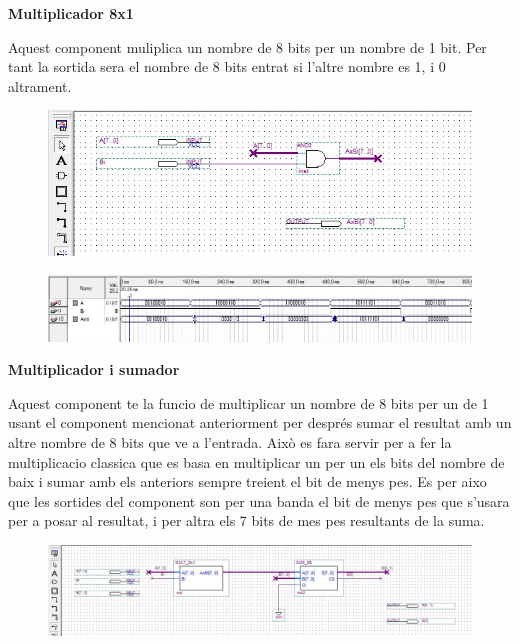 \documentclass[12pt, a4papre]{article}
\begin{document}
	\textbf{\large{Multiplicador 8x1}}
	
	Aquest component muliplica un nombre de 8 bits per  un nombre de 1 bit. Per tant la sortida sera el nombre de 8 bits entrat si l'altre nombre es 1, i 0 altrament.
	\begin{center}
	
	\begin{figure}[H]
		\begin{center}
		\includegraphics[width=150mm]{MULT8x1.jpeg}
		\end{center}
	\end{figure}
	
	\begin{center}
	
	\begin{figure}[H]
		\begin{center}
		\includegraphics[width=150mm]{MULT8x1simul.jpeg}
		\end{center}
	\end{figure}
	
	\end{center}
	
	\textbf{\large{Multiplicador i sumador}}
	
	Aquest component te la funcio de multiplicar un nombre de 8 bits per un de 1 usant el component mencionat anteriorment per després sumar el resultat amb un altre nombre de 8 bits que ve a l'entrada. Això es fara servir per a fer la multiplicacio classica que es basa en multiplicar un per un els bits del nombre de baix i sumar amb els anteriors sempre treient el bit de menys pes. Es per aixo que les sortides del component son per una banda el bit de menys pes que s'usara per a posar al resultat, i per altra els 7 bits de mes pes resultants de la suma. 
	
	\begin{center}
	\begin{figure}[H]
		\begin{center}
		\includegraphics[width=150mm]{MULT_+SUM.jpeg}
		\end{center}
	\end{figure}
	

\end{center}
\end{center}
\end{document}
